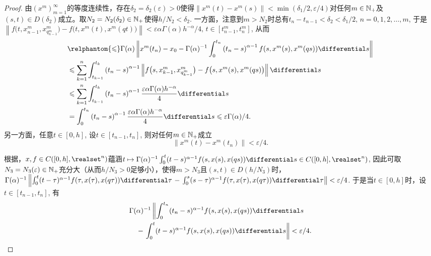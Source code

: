 \begin{proof}
    由$\left(x^m\right)_{m=1}^\infty$的等度连续性，存在$\delta_2=\delta_2(\varepsilon)>0$使得$\left\|x^m(t)-x^m(s)\right\|<\min \left(\delta_1/2,\allowbreak\varepsilon/4\right)$对任何$m\in \mathbb{N_+}$及$(s,t)\in D\left(\delta_2\right)$成立。取$N_2=N_2(\delta_2)\in \mathbb{N_+}$使得$h/N_2<\delta_2$. 一方面，注意到$m>N_2$时总有$t_n-t_{n-1}<\delta_2<\delta_1/2,\,n=0,1,2,\dots,m$, 于是$\left\|f\bigl(t,x^m_{n-1},x^m_{q^m_{n-1}}\bigr)-f\bigl(t,x^m(t),x^m(qt)\bigr)\right\|<\varepsilon \alpha \Gamma(\alpha) h^{-\alpha} / 4,\,t\in\left[t^m_{n-1},t^m_n\right]$, 从而
    \begin{equation}\label{tn}
        \begin{aligned}
            &\relphantom{\leqslant}\Gamma(\alpha)\left\|x^m(t_n)-x_0-\Gamma(\alpha)^{-1}\int_{0}^{t_n}\left(t_n-s\right)^{\alpha-1}f(s,x^m(s),x^m(qs))\differential s\right\|
            \\ &\leqslant \sum_{k=1}^{n}\int_{t_{k-1}}^{t_k}\left(t_n-s\right)^{\alpha-1}\left\|f\bigl(s,x^m_{k-1},x^m_{q^m_{k-1}}\bigr)-f\bigl(s,x^m(s),x^m(qs)\bigr)\right\|\differential s
            \\ &\leqslant \sum_{k=1}^{n}\int_{t_{k-1}}^{t_k}\left(t_n-s\right)^{\alpha-1} \frac{\varepsilon \alpha \Gamma(\alpha) h^{-\alpha}}{4} \differential s
            \\ &=\int_{0}^{t_n} \left(t_n-s\right)^{\alpha-1} \frac{\varepsilon \alpha \Gamma(\alpha) h^{-\alpha}}{4} \differential s
            \leqslant \varepsilon\Gamma(\alpha)/4.
        \end{aligned}
    \end{equation}
    另一方面，任意$t\in [0,h]$, 设$t\in\left[t_{n-1},t_n\right]$, 则对任何$m\in \mathbb{N_+}$成立
    \begin{equation}\label{xmtnt}
        \left\|x^m(t)-x^m(t_n)\right\|<\varepsilon/4.
    \end{equation}

    根据\cite[Proposition 3.2]{Webb}，$x,f\in C([0,h],\realset^n)$蕴涵$t\mapsto \Gamma(\alpha)^{-1}\int_{0}^{t}(t-s)^{\alpha-1}f(s,x(s),x(qs))\differential s\in C([0,h],\realset^n)$, 因此可取$N_3=N_3(\varepsilon)\in \mathbb{N_+}$充分大（从而$h/N_3>0$足够小），使得$m>N_3$且$(s,t)\in D(h/N_3)$时，$\Gamma(\alpha)^{-1}\allowbreak\left\|\int_{0}^{t}(t-\tau)^{\alpha-1}f(\tau,x(\tau),x(q\tau))\differential \tau\right.\allowbreak-\left.\int_{0}^{s}(s-\tau)^{\alpha-1}f(\tau,x(\tau),x(q\tau))\differential \tau\right\|\allowbreak <\varepsilon/4$. 于是当$t\in [0,h]$时，设$t\in\left[t_{n-1},t_n\right]$, 有
    \begin{equation}\label{xtnt}
        \begin{multlined}
            \Gamma(\alpha)^{-1}\left\|\int_{0}^{t_n}(t_n-s)^{\alpha-1}f(s,x(s),x(qs))\differential s\right.
            \\-\left.\int_{0}^{t}(t-s)^{\alpha-1}f(s,x(s),x(qs))\differential s\right\|<\varepsilon/4.
        \end{multlined}
    \end{equation}
    

\end{proof}
